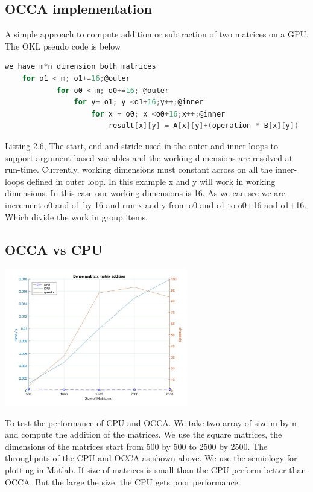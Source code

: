 \subsection{OCCA implementation}
A simple approach to compute addition or subtraction of two matrices on a GPU. The OKL pseudo code is below 
\begin{lstlisting}[language=C, caption=matrix addition or subtraction in OCCA]
	we have m*n dimension both matrices
	for o1 < m; o1+=16;@outer
			for o0 < m; o0+=16; @outer
				for y= o1; y <o1+16;y++;@inner
					for x = o0; x <o0+16;x++;@inner
						result[x][y] = A[x][y]+(operation * B[x][y])
\end{lstlisting}
Listing 2.6, The start, end and stride used in the outer and inner loops to support argument based variables and the working dimensions are resolved at run-time. Currently, working dimensions must constant across on all the inner-loops defined in outer loop. In this example x and y will work in working dimensions. In this case our working dimensions is 16. As we can see we are increment o0 and o1 by 16 and run x and y from o0 and o1 to o0+16 and o1+16. Which divide the work in group items.
\subsection{OCCA vs CPU}
\begin{center}
	\includegraphics[width = 8cm]{Chapters/matrix_addition.jpg}
\end{center}
To test the performance of CPU and OCCA. We take two array of size m-by-n and compute the addition of the matrices. We use the square matrices, the dimensions of the matrices start from 500 by 500 to 2500 by 2500. The throughputs of the CPU and OCCA as shown above. We use the semiology for plotting in Matlab. If size of matrices is small than the CPU perform better than OCCA. But the large the size, the CPU gets poor performance.